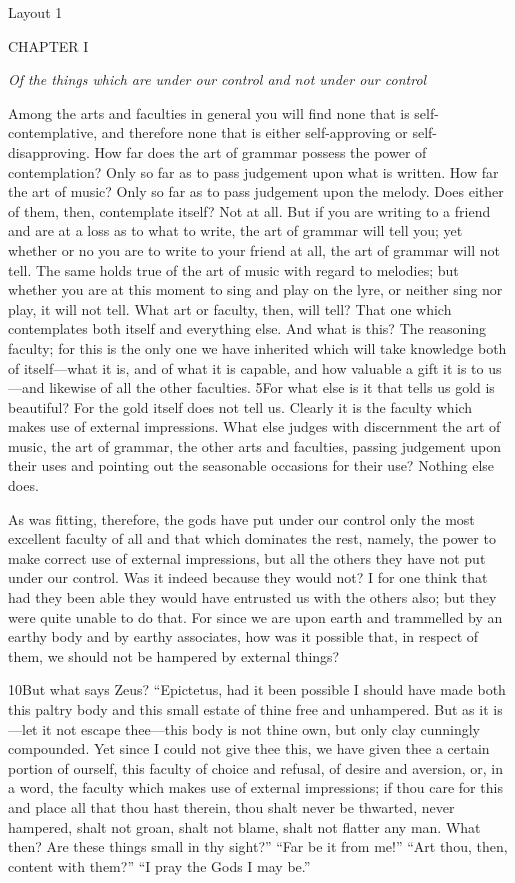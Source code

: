 

Layout 1

CHAPTER I

\emph{Of the things which are under our control and not under our control}

Among the arts and faculties in general you will find none that is self-contemplative, and therefore none that is either self-approving or self-disapproving. How far does the art of grammar possess the power of contemplation? Only so far as to pass judgement upon what is written. How far the art of music? Only so far as to pass judgement upon the melody. Does either of them, then, contemplate itself? Not at all. But if you are writing to a friend and are at a loss as to what to write, the art of grammar will tell you; yet whether or no you are to write to your friend at all, the art of grammar will not tell. The same holds true of the art of music with regard to melodies; but whether you are at this moment to sing and play on the lyre, or neither sing nor play, it will not tell. What art or faculty, then, will tell? That one which contemplates both itself and everything else. And what is this? The reasoning faculty; for this is the only one we have inherited which will take knowledge both of itself—what it is, and of what it is capable, and how valuable a gift it is to us—and likewise of all the other faculties. 5For what else is it that tells us gold is beautiful? For the gold itself does not tell us. Clearly it is the faculty which makes use of external impressions. What else judges with discernment the art of music, the art of grammar, the other arts and faculties, passing judgement upon their uses and pointing out the seasonable occasions for their use? Nothing else does.

As was fitting, therefore, the gods have put under our control only the most excellent faculty of all and that which dominates the rest, namely, the power to make correct use of external impressions, but all the others they have not put under our control. Was it indeed because they would not? I for one think that had they been able they would have entrusted us with the others also; but they were quite unable to do that. For since we are upon earth and trammelled by an earthy body and by earthy associates, how was it possible that, in respect of them, we should not be hampered by external things?

10But what says Zeus? ``Epictetus, had it been possible I should have made both this paltry body and this small estate of thine free and unhampered. But as it is—let it not escape thee—this body is not thine own, but only clay cunningly compounded. Yet since I could not give thee this, we have given thee a certain portion of ourself, this faculty of choice and refusal, of desire and aversion, or, in a word, the faculty which makes use of external impressions; if thou care for this and place all that thou hast therein, thou shalt never be thwarted, never hampered, shalt not groan, shalt not blame, shalt not flatter any man. What then? Are these things small in thy sight?'' ``Far be it from me!'' ``Art thou, then, content with them?'' ``I pray the Gods I may be.''

